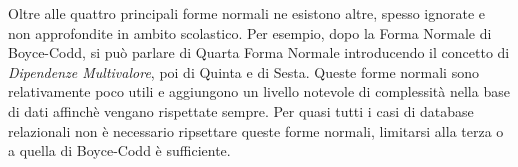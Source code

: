 Oltre alle quattro principali forme normali ne esistono altre, spesso ignorate e non approfondite in ambito scolastico. Per esempio, dopo la Forma Normale di Boyce-Codd, si può parlare di Quarta Forma Normale introducendo il concetto di \emph{Dipendenze Multivalore}, poi di Quinta e di Sesta. Queste forme normali sono relativamente poco utili e aggiungono un livello notevole di complessità nella base di dati affinchè vengano rispettate sempre. Per quasi tutti i casi di database relazionali non è necessario ripsettare queste forme normali, limitarsi alla terza o a quella di Boyce-Codd è sufficiente.